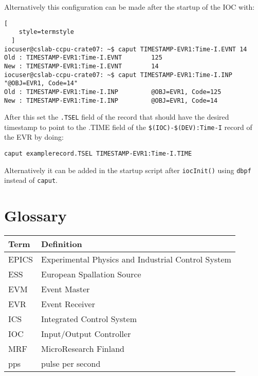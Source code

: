 \documentclass[11pt
  , a4paper
  , article
  , oneside
  , showtrims
]{memoir}
\begin{document}
Alternatively this configuration can be made after the startup of the IOC with:
\begin{lstlisting}[
    style=termstyle
  ]
iocuser@cslab-ccpu-crate07: ~$ caput TIMESTAMP-EVR1:Time-I.EVNT 14
Old : TIMESTAMP-EVR1:Time-I.EVNT        125
New : TIMESTAMP-EVR1:Time-I.EVNT        14
iocuser@cslab-ccpu-crate07: ~$ caput TIMESTAMP-EVR1:Time-I.INP "@OBJ=EVR1, Code=14"
Old : TIMESTAMP-EVR1:Time-I.INP         @OBJ=EVR1, Code=125
New : TIMESTAMP-EVR1:Time-I.INP         @OBJ=EVR1, Code=14
\end{lstlisting}

After this set the \texttt{.TSEL} field of the record that should have the desired timestamp to point to the .TIME field of the \texttt{\$(IOC)-\$(DEV):Time-I} record of the EVR by doing:
\begin{lstlisting}[style=termstyle]
caput examplerecord.TSEL TIMESTAMP-EVR1:Time-I.TIME
\end{lstlisting}
Alternatively it can be added in the startup script after \texttt{iocInit()} using \texttt{dbpf} instead of \texttt{caput}.\\



\clearpage



\chapter*{Glossary}\label{sec:glossary}
\begin{table}[!htb]
  \begin{tabular}{ll}
    \toprule
    \textbf{Term} & Definition                                          \\\midrule
    EPICS         & Experimental Physics and Industrial Control System  \\
    ESS           & European Spallation Source                          \\
    EVM           & Event Master                                        \\
    EVR           & Event Receiver                                      \\
    ICS           & Integrated Control System                           \\
    IOC           & Input/Output Controller                             \\
    MRF           & MicroResearch Finland                               \\
    pps           & pulse per second                                    \\
    \bottomrule
  \end{tabular}
  \label{table:glossary}
\end{table}
\end{document}
